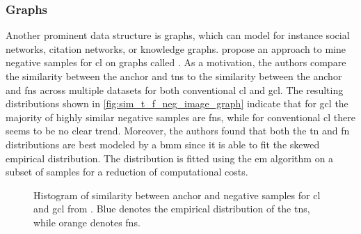 \subsubsection{Graphs}\label{subsec:graph_distribution}

Another prominent data structure is graphs, which can model 
for instance social networks, citation networks, or knowledge graphs.
\citet{progcl_2022} propose an approach to mine negative samples for \ac{cl} on graphs called \progcl{}. 
As a motivation, the authors compare the similarity between the anchor and \acp{tn} 
to the similarity between the anchor and \acp{fn} 
across multiple datasets for both conventional \ac{cl} and \ac{gcl}.
The resulting distributions shown in \autoref{fig:sim_t_f_neg_image_graph} 
indicate that for \ac{gcl} the majority of highly similar negative samples are \acp{fn}, 
while for conventional \ac{cl} there seems to be no clear trend.
Moreover, the authors found that both the \ac{tn} and \ac{fn} distributions are best modeled by a \ac{bmm} 
since it is able to fit the skewed empirical distribution.
The distribution is fitted using the \ac{em} algorithm on a subset of samples for a reduction of computational costs.

\begin{figure}%
    \centering
    \qquad
    \caption{Histogram of similarity between anchor and negative samples for \ac{cl} and \ac{gcl} from \citet{progcl_2022}.
    Blue denotes the empirical distribution of the \acp{tn}, while orange denotes \acp{fn}.}%
    \label{fig:sim_t_f_neg_image_graph}%
\end{figure}


